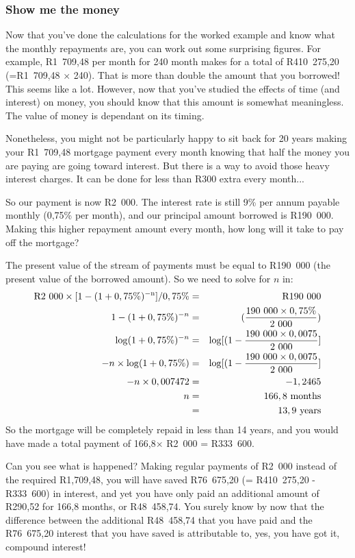\subsubsection{Show me the money}
Now that you've done the calculations for the worked example and know what the monthly repayments are, you can work out some surprising figures. For example, R1~709,48 per month for 240 month makes for a total of R410~275,20 (=R1~709,48 $\times$ 240). That is more than double the amount that you borrowed! This seems like a lot. However, now that you've studied the effects of time (and interest) on money, you should know that this amount is somewhat meaningless. The value of money is dependant on its timing.

Nonetheless, you might not be particularly happy to sit back for 20 years making your R1~709,48 mortgage payment every month knowing that half the money you are paying are going toward interest. But there is a way to avoid those heavy interest charges. It can be done for less than R300 extra every month...

So our payment is now R2~000. The interest rate is still 9\% per annum payable monthly (0,75\% per month), and our principal amount borrowed is R190~000. Making this higher repayment amount every month, how long will it take to pay off the mortgage?

The present value of the stream of payments must be equal to R190~000 (the present value of the borrowed amount). So we need to solve for $n$ in:
\begin{eqnarray*}
\rm{R}2~000 \times [1 - (1 + 0,75\%)^{-n}]/0,75\% &=& \rm{R}190~000\\
1 - (1 + 0,75\%)^{-n} &=& (\frac{190~000\times 0,75\%}{2~000})\\
\log(1+0,75\%)^{-n} &=& \log[(1 - \frac{190~000\times 0,0075}{2~000}]\\
-n\times \log(1+0,75\%) &=& \log[(1 - \frac{190~000\times 0,0075}{2~000}]\\
-n \times 0,007472 &=& -1,2465\\
n &=& 166,8 \mbox{ months}\\
& =& 13,9 \mbox{ years}
\end{eqnarray*}
So the mortgage will be completely repaid in less than 14 years, and you would have made a total payment of 166,8$\times$ R2~000 = R333~600.

Can you see what is happened? Making regular payments of R2~000 instead of the required R1,709,48, you will have saved R76~675,20 (= R410~275,20 - R333~600) in interest, and yet you have only paid an additional amount of R290,52 for 166,8 months, or R48~458,74. You surely know by now that the difference between the additional R48~458,74 that you have paid and the R76~675,20 interest that you have saved is attributable to, yes, you have got it, compound interest!

